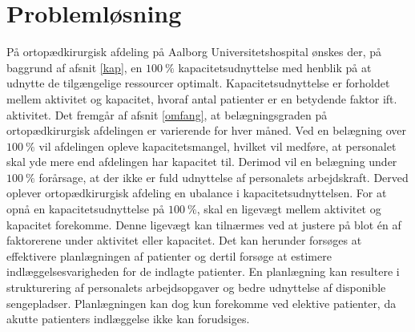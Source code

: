 \chapter{Problemløsning} \label{Problemloesning}
På ortopædkirurgisk afdeling på Aalborg Universitetshospital ønskes der, på baggrund af afsnit \ref{kap}, en $100~\%$ kapacitetsudnyttelse med henblik på at udnytte de tilgængelige ressourcer optimalt. Kapacitetsudnyttelse er forholdet mellem aktivitet og kapacitet, hvoraf antal patienter er en betydende faktor ift. aktivitet. 
Det fremgår af afsnit \ref{omfang}, at belægningsgraden på ortopædkirurgisk afdelingen er varierende for hver måned. Ved en belægning over $100~\%$ vil afdelingen opleve kapacitetsmangel, hvilket vil medføre, at personalet skal yde mere end afdelingen har kapacitet til. Derimod vil en belægning under $100~\%$ forårsage, at der ikke er fuld udnyttelse af personalets arbejdskraft. Derved oplever ortopædkirurgisk afdeling en ubalance i kapacitetsudnyttelsen. 
For at opnå en kapacitetsudnyttelse på $100~\%$, skal en ligevægt mellem aktivitet og kapacitet forekomme. Denne ligevægt kan tilnærmes ved at justere på blot én af faktorerene under aktivitet eller kapacitet\cite{Bames2015}. Det kan herunder forsøges at effektivere planlægningen af patienter og dertil forsøge at estimere indlæggelsesvarigheden for de indlagte patienter. En planlægning kan resultere i strukturering af personalets arbejdsopgaver og bedre udnyttelse af disponible sengepladser. Planlægningen kan dog kun forekomme ved elektive patienter, da akutte patienters indlæggelse ikke kan forudsiges. 



